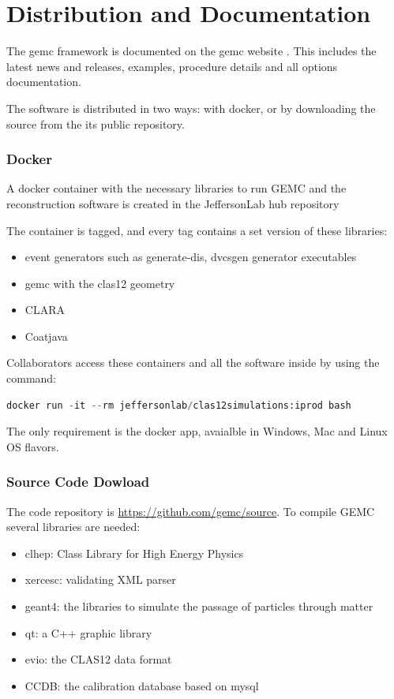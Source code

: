\section{Distribution and Documentation}

The gemc framework is documented on the gemc website \cite{gemc}. This includes the latest news and releases,
examples, procedure details and all options documentation.

The software is distributed in two ways: with docker, or by downloading the source from the its public repository.

\subsubsection{Docker}

A docker container with the necessary libraries to run GEMC and the reconstruction software
is created in the JeffersonLab hub repository \cite{jlabDocker}


The container is tagged, and every tag contains a set version of these libraries:

\begin{itemize}
	\item event generators such as generate-dis, dvcsgen generator executables
	\item gemc with the clas12 geometry
	\item CLARA
	\item Coatjava
\end{itemize}

Collaborators access these containers and all the software inside by using the command:

\begin{lstlisting}[language=Python]
docker run -it --rm jeffersonlab/clas12simulations:iprod bash
\end{lstlisting}

The only requirement is the docker app, avaialble in Windows, Mac and Linux OS flavors.


\subsubsection{Source Code Dowload}

The code repository is \url{https://github.com/gemc/source}. To compile GEMC several libraries are needed:

\begin{itemize}
	\item clhep: Class Library for High Energy Physics \cite{clhep}
	\item xercesc: validating XML parser \cite{xercesc}
	\item geant4: the libraries to simulate the passage of particles through matter \cite{geant4}
	\item qt: a C++ graphic library \cite{qt}
	\item evio: the CLAS12 data format \cite{evio}
	\item CCDB: the calibration database based on mysql \cite{ccdb}
\end{itemize}


